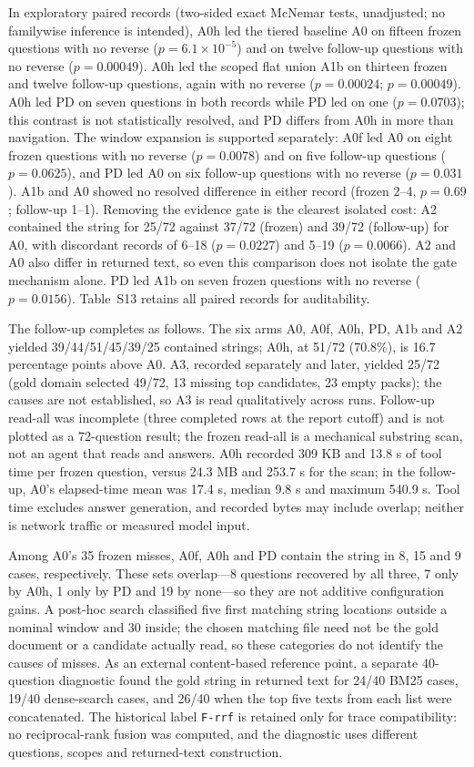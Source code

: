 \documentclass[11pt]{article}
\begin{document}
In exploratory paired records (two-sided exact McNemar tests, unadjusted; no
familywise inference is intended), A0h led the tiered baseline A0 on
fifteen frozen questions with no reverse ($p=6.1\times10^{-5}$) and on
twelve follow-up questions with no reverse ($p=0.00049$). A0h led the
scoped flat union A1b on thirteen frozen and twelve follow-up questions,
again with no reverse ($p=0.00024$; $p=0.00049$). A0h led PD on seven
questions in both records while PD led on one ($p=0.0703$); this contrast
is not statistically resolved, and PD differs from A0h in more than
navigation. The window expansion is supported separately: A0f led A0 on
eight frozen questions with no reverse ($p=0.0078$) and on five follow-up
questions ($p=0.0625$), and PD led A0 on six follow-up questions with no
reverse ($p=0.031$). A1b and A0 showed no resolved difference in either
record (frozen 2--4, $p=0.69$; follow-up 1--1). Removing the evidence gate
is the clearest isolated cost: A2 contained the string for 25/72 against
37/72 (frozen) and 39/72 (follow-up) for A0, with discordant records of
6--18 ($p=0.0227$) and 5--19 ($p=0.0066$). A2 and A0 also differ in
returned text, so even this comparison does not isolate the gate mechanism
alone. PD led A1b on seven frozen questions with no reverse ($p=0.0156$).
Table~S13 retains all paired records for auditability.

The follow-up completes as follows. The six arms A0, A0f, A0h, PD, A1b and
A2 yielded 39/44/51/45/39/25 contained strings; A0h, at 51/72 (70.8\%), is
16.7 percentage points above A0. A3, recorded separately and later, yielded
25/72 (gold domain selected 49/72, 13 missing top candidates, 23 empty
packs); the causes are not established, so A3 is read qualitatively across
runs. Follow-up read-all was incomplete (three
completed rows at the report cutoff) and is not plotted as a 72-question
result; the frozen read-all is a mechanical substring scan, not an agent
that reads and answers. A0h recorded 309 KB and 13.8 s of tool time per
frozen question, versus 24.3 MB and 253.7 s for the scan; in the follow-up,
A0's elapsed-time mean was 17.4 s, median 9.8 s and maximum 540.9 s. Tool
time excludes answer generation, and recorded bytes may include overlap;
neither is network traffic or measured model input.

Among A0's 35 frozen misses, A0f, A0h and PD contain the string in 8, 15 and
9 cases, respectively. These sets overlap---8 questions recovered by all
three, 7 only by A0h, 1 only by PD and 19 by none---so they are not
additive configuration gains. A post-hoc search classified five first
matching string locations outside a nominal window and 30 inside; the chosen
matching file need not be the gold document or a candidate actually read, so
these categories do not identify the causes of misses. As an external
content-based reference point, a separate 40-question diagnostic found the
gold string in returned text for 24/40 BM25 cases, 19/40 dense-search cases,
and 26/40 when the top five texts from each list were concatenated. The
historical label \texttt{F-rrf} is retained only for trace compatibility: no
reciprocal-rank fusion was computed, and the diagnostic uses different
questions, scopes and returned-text construction.
\end{document}
